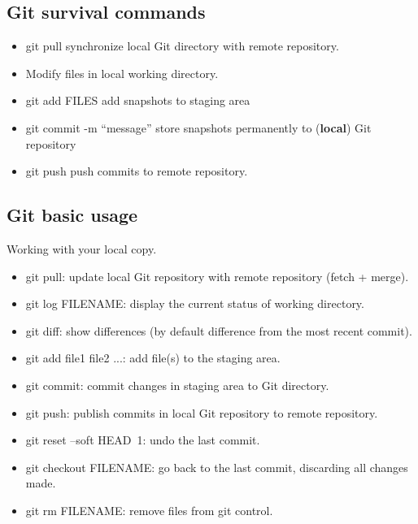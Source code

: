 \subsection*{Git survival commands}

\begin{itemize}
  \item \colorbox{shadecolor}{git pull} synchronize local Git directory with remote repository.
  \item Modify files in local working directory.
  \item \colorbox{shadecolor}{git add FILES} add snapshots to staging area
  \item \colorbox{shadecolor}{git commit -m ``message''} store snapshots permanently to ({\bf local}) Git repository
  \item \colorbox{shadecolor}{git push} push commits to remote repository.
\end{itemize}

\subsection*{Git basic usage}

Working with your local copy.

\begin{itemize}

    \item \colorbox{shadecolor}{git pull}: update local Git repository with remote repository (fetch + merge).
    
    \item \colorbox{shadecolor}{git log FILENAME}: display the current status of working directory.
    
    \item \colorbox{shadecolor}{git diff}: show differences (by default difference from the most recent commit). 
    
    \item \colorbox{shadecolor}{git add file1 file2 ...}: add file(s) to the staging area.
    
    \item \colorbox{shadecolor}{git commit}: commit changes in staging area to Git directory.
    
    \item \colorbox{shadecolor}{git push}: publish commits in local Git repository to remote repository.

    \item \colorbox{shadecolor}{git reset --soft HEAD~1}: undo the last commit. 

    \item \colorbox{shadecolor}{git checkout FILENAME}: go back to the last commit, discarding all changes made.
    
    \item \colorbox{shadecolor}{git rm FILENAME}: remove files from git control.
\end{itemize}


